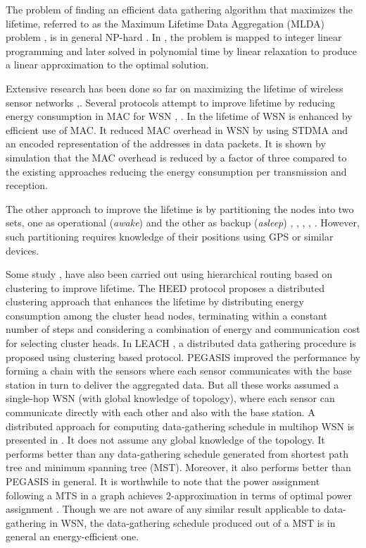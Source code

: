 \documentclass[10pt]{llncs}
\begin{document}
The problem of finding an efficient data gathering algorithm that maximizes the lifetime, referred to as the Maximum Lifetime Data Aggregation (MLDA) problem \cite{Intanagonwiwat00}, \cite{Kalpakis03} is in general NP-hard \cite{Ramanathan00}. In \cite{Kalpakis03}, the problem is mapped to integer linear programming and later solved in polynomial time by linear relaxation to produce a linear approximation to the optimal solution.

Extensive research has been done so far on maximizing the lifetime of wireless sensor networks \cite{Song09},\cite{Wang08}. Several protocols attempt to improve lifetime by reducing energy consumption in MAC for WSN \cite{Ye02}, \cite{Yu07}. In \cite{Schurgers02} the lifetime of WSN is enhanced by efficient use of MAC. It reduced MAC overhead in WSN by using STDMA and an encoded representation of the addresses in data packets. It is shown by simulation that the MAC overhead is reduced by a factor of three compared to the existing approaches reducing the energy consumption per transmission and reception.

The other approach to improve the lifetime is by partitioning the nodes into two sets, one as operational ({\it awake}) and the other as backup ({\it asleep}) \cite{Cerpa02}, \cite{Xu01}, \cite{Chen02}, \cite{Hong08}, \cite{HongTA}. However, such partitioning requires knowledge of their positions using GPS or similar devices. 

Some study \cite{Lin97}, \cite{Banerjee07L} have also been carried out using hierarchical routing based on clustering to improve lifetime. The HEED protocol \cite{Younis04} proposes a distributed clustering approach that enhances the lifetime by distributing energy consumption among the cluster head nodes, terminating within a constant number of steps and considering a combination of energy and communication cost for selecting cluster heads. In LEACH \cite{Heinzelman00}, a distributed data gathering procedure is proposed using clustering based protocol. PEGASIS \cite{Lindsey02} improved the performance by forming a chain with the sensors where each sensor communicates with the base station in turn to deliver the aggregated data. But all these works assumed a single-hop WSN (with global knowledge of topology), where each sensor can communicate directly with each other and also with the base station. A distributed approach for computing data-gathering schedule in multihop WSN is presented in \cite{Bhattacharjee07}. It does not assume any global knowledge of the topology. It performs better than any data-gathering schedule generated from shortest path tree and minimum spanning tree (MST). Moreover, it also performs better than PEGASIS \cite{Lindsey02} in general. It is worthwhile to note that the power assignment following a MTS in a graph achieves $2$-approximation in terms of optimal power assignment \cite{Li05}. Though we are not aware of any similar result applicable to data-gathering in WSN, the data-gathering schedule produced out of a MST is in general an energy-efficient one.
\end{document}
